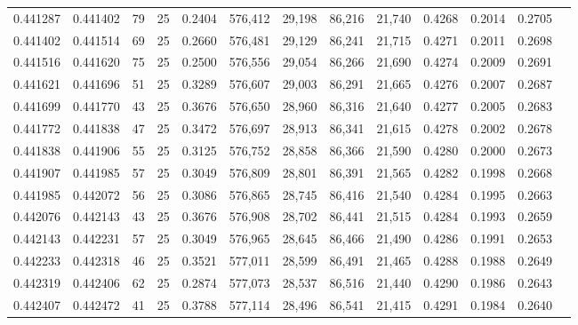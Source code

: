 \begin{tabular}{rrrrrrrrrrrrr}
0.441287 & 0.441402 &    79 &  25 &                                     0.2404 & 576,412 &  29,198 &  86,216 &  21,740 & 0.4268 & 0.2014 & 0.2705 \\
0.441402 & 0.441514 &    69 &  25 &                                     0.2660 & 576,481 &  29,129 &  86,241 &  21,715 & 0.4271 & 0.2011 & 0.2698 \\
0.441516 & 0.441620 &    75 &  25 &                                     0.2500 & 576,556 &  29,054 &  86,266 &  21,690 & 0.4274 & 0.2009 & 0.2691 \\
0.441621 & 0.441696 &    51 &  25 &                                     0.3289 & 576,607 &  29,003 &  86,291 &  21,665 & 0.4276 & 0.2007 & 0.2687 \\
0.441699 & 0.441770 &    43 &  25 &                                     0.3676 & 576,650 &  28,960 &  86,316 &  21,640 & 0.4277 & 0.2005 & 0.2683 \\
0.441772 & 0.441838 &    47 &  25 &                                     0.3472 & 576,697 &  28,913 &  86,341 &  21,615 & 0.4278 & 0.2002 & 0.2678 \\
0.441838 & 0.441906 &    55 &  25 &                                     0.3125 & 576,752 &  28,858 &  86,366 &  21,590 & 0.4280 & 0.2000 & 0.2673 \\
0.441907 & 0.441985 &    57 &  25 &                                     0.3049 & 576,809 &  28,801 &  86,391 &  21,565 & 0.4282 & 0.1998 & 0.2668 \\
0.441985 & 0.442072 &    56 &  25 &                                     0.3086 & 576,865 &  28,745 &  86,416 &  21,540 & 0.4284 & 0.1995 & 0.2663 \\
0.442076 & 0.442143 &    43 &  25 &                                     0.3676 & 576,908 &  28,702 &  86,441 &  21,515 & 0.4284 & 0.1993 & 0.2659 \\
0.442143 & 0.442231 &    57 &  25 &                                     0.3049 & 576,965 &  28,645 &  86,466 &  21,490 & 0.4286 & 0.1991 & 0.2653 \\
0.442233 & 0.442318 &    46 &  25 &                                     0.3521 & 577,011 &  28,599 &  86,491 &  21,465 & 0.4288 & 0.1988 & 0.2649 \\
0.442319 & 0.442406 &    62 &  25 &                                     0.2874 & 577,073 &  28,537 &  86,516 &  21,440 & 0.4290 & 0.1986 & 0.2643 \\
0.442407 & 0.442472 &    41 &  25 &                                     0.3788 & 577,114 &  28,496 &  86,541 &  21,415 & 0.4291 & 0.1984 & 0.2640 \\

\end{tabular}
